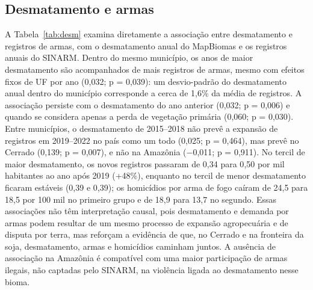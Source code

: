 \documentclass[11pt,a4paper]{article}
\begin{document}
\subsection*{Desmatamento e armas}

A Tabela~\ref{tab:desm} examina diretamente a associação entre desmatamento e registros de armas, com o desmatamento anual do MapBiomas e os registros anuais do SINARM. Dentro do mesmo município, os anos de maior desmatamento são acompanhados de mais registros de armas, mesmo com efeitos fixos de UF por ano (0{,}032; p = 0{,}039): um desvio-padrão do desmatamento anual dentro do município corresponde a cerca de 1{,}6\% da média de registros. A associação persiste com o desmatamento do ano anterior (0{,}032; p = 0{,}006) e quando se considera apenas a perda de vegetação primária (0{,}060; p = 0{,}030). Entre municípios, o desmatamento de 2015--2018 não prevê a expansão de registros em 2019--2022 no país como um todo (0{,}025; p = 0{,}464), mas prevê no Cerrado (0{,}139; p = 0{,}007), e não na Amazônia ($-$0{,}011; p = 0{,}911). No tercil de maior desmatamento, os novos registros passaram de 0{,}34 para 0{,}50 por mil habitantes ao ano após 2019 (+48\%), enquanto no tercil de menor desmatamento ficaram estáveis (0{,}39 e 0{,}39); os homicídios por arma de fogo caíram de 24{,}5 para 18{,}5 por 100 mil no primeiro grupo e de 18{,}9 para 13{,}7 no segundo. Essas associações não têm interpretação causal, pois desmatamento e demanda por armas podem resultar de um mesmo processo de expansão agropecuária e de disputa por terra, mas reforçam a evidência de que, no Cerrado e na fronteira da soja, desmatamento, armas e homicídios caminham juntos. A ausência de associação na Amazônia é compatível com uma maior participação de armas ilegais, não captadas pelo SINARM, na violência ligada ao desmatamento nesse bioma.
\end{document}
